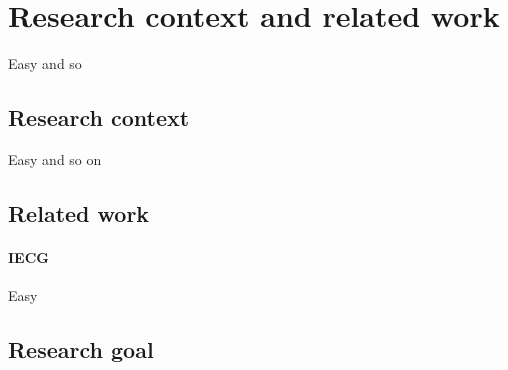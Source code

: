 \chapter{Research context and related work}
Easy and so
\section{Research context}
Easy and so on
\section{Related work}
\subsubsection{IECG}
Easy
\section{Research goal}
